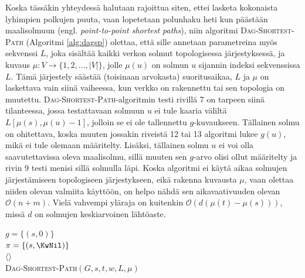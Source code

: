 \documentclass[finnish]{tktltiki2}
\newenvironment{finalgo}[1][htb]{
  \renewcommand{\algorithmcfname}{Algoritmi}
  \begin{algorithm}[#1]
}{\end{algorithm}}
\theoremstyle{definition}
\theoremstyle{remark}
\begin{document}
Koska tässäkin yhteydessä halutaan rajoittua siten, ettei lasketa kokonaista lyhimpien polkujen puuta, vaan lopetetaan polunhaku heti kun päästään maalisolmuun (engl. \textit{point-to-point shortest paths}), niin algoritmi \textsc{Dag-Shortest-Path} (Algoritmi \ref{alg:dagsp}) olettaa, että sille annetaan parametreina myös sekvenssi $L$, joka sisältää kaikki verkon solmut topologisessa järjestyksessä, ja kuvaus $\mu \colon V \to \{ 1, 2, \dots, |V| \}$, jolle $\mu(u)$ on solmun $u$ sijannin indeksi sekvenssissa $L$. Tämä järjestely säästää (toisinaan arvokasta) suoritusaikaa, $L$ ja $\mu$ on laskettava vain siinä vaiheessa, kun verkko on rakennettu tai sen topologia on muutettu. \textsc{Dag-Shortest-Path}-algoritmin testi rivillä 7 on tarpeen siinä tilanteessa, jossa testattavaan solmuun $u$ ei tule kaaria väliltä $L[\mu(s), \mu(u) - 1]$, jolloin se ei ole tallennettu $g$-kuvaukseen. Tällainen solmu on ohitettava, koska muuten jossakin riveistä 12 tai 13 algoritmi lukee $g(u)$, mikä ei tule olemaan määritelty. Lisäksi, tällainen solmu $u$ ei voi olla saavutettavissa oleva maalisolmu, sillä muuten sen $g$-arvo olisi ollut määritelty ja rivin 9 testi menisi sillä solmulla läpi. Koska algoritmi ei käytä aikaa solmujen järjestämiseen topologiseen järjestykseen, eikä rakenna kuvausta $\mu$, vaan olettaa niiden olevan valmiita käyttöön, on helpo nähdä sen aikavaativuuden olevan $\mathcal{O}(n + m)$. Vielä vahvempi yläraja on kuitenkin $\mathcal{O}(d(\mu(t) - \mu(s)))$, missä $d$ on solmujen keskiarvoinen lähtöaste.
\begin{finalgo}[h]
$g = \{ (s, 0) \}$ \\
$\pi = \{ (s, \KwNil) \}$ \\
\KwRet $\langle \rangle$ \\
\caption{\textsc{Dag-Shortest-Path}$(G, s, t, w, L, \mu)$}
\label{alg:dagsp}
\end{finalgo}
\end{document}
